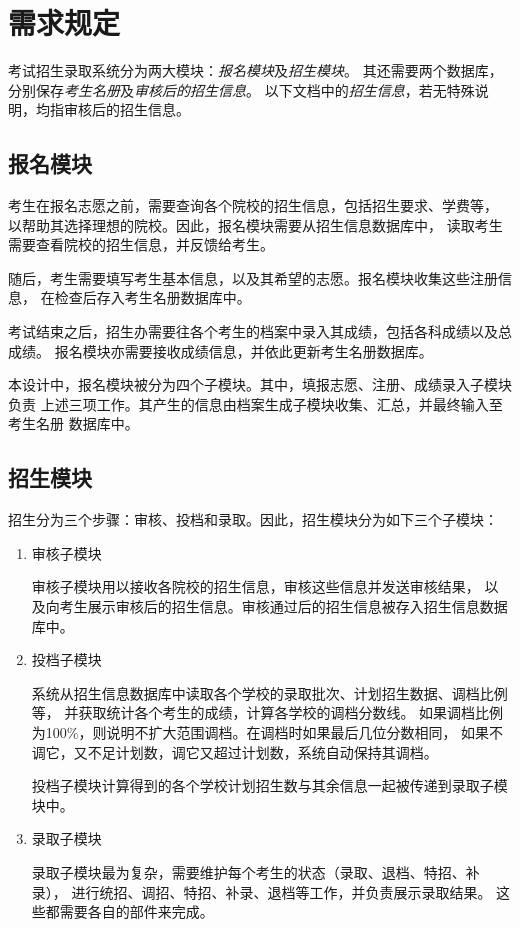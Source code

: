 \documentclass[CJK,utf8]{ctexrep}
\begin{document}
\section*{需求规定}

考试招生录取系统分为两大模块：\emph{报名模块}及\emph{招生模块}。
其还需要两个数据库，分别保存\emph{考生名册}及\emph{审核后的招生信息}。
以下文档中的\emph{招生信息}，若无特殊说明，均指审核后的招生信息。

\subsection*{报名模块}

考生在报名志愿之前，需要查询各个院校的招生信息，包括招生要求、学费等，
以帮助其选择理想的院校。因此，报名模块需要从招生信息数据库中，
读取考生需要查看院校的招生信息，并反馈给考生。

随后，考生需要填写考生基本信息，以及其希望的志愿。报名模块收集这些注册信息，
在检查后存入考生名册数据库中。

考试结束之后，招生办需要往各个考生的档案中录入其成绩，包括各科成绩以及总成绩。
报名模块亦需要接收成绩信息，并依此更新考生名册数据库。

本设计中，报名模块被分为四个子模块。其中，填报志愿、注册、成绩录入子模块负责
上述三项工作。其产生的信息由档案生成子模块收集、汇总，并最终输入至考生名册
数据库中。

\subsection*{招生模块}

招生分为三个步骤：审核、投档和录取。因此，招生模块分为如下三个子模块：

\begin{enumerate}
	\item 审核子模块
	
	审核子模块用以接收各院校的招生信息，审核这些信息并发送审核结果，
	以及向考生展示审核后的招生信息。审核通过后的招生信息被存入招生信息数据库中。
	
	\item 投档子模块
	
	系统从招生信息数据库中读取各个学校的录取批次、计划招生数据、调档比例等，
	并获取统计各个考生的成绩，计算各学校的调档分数线。
	如果调档比例为100\%，则说明不扩大范围调档。在调档时如果最后几位分数相同，
	如果不调它，又不足计划数，调它又超过计划数，系统自动保持其调档。
	
	投档子模块计算得到的各个学校计划招生数与其余信息一起被传递到录取子模块中。
	
	\item 录取子模块
	
	录取子模块最为复杂，需要维护每个考生的状态（录取、退档、特招、补录），
	进行统招、调招、特招、补录、退档等工作，并负责展示录取结果。
	这些都需要各自的部件来完成。
\end{enumerate}
\end{document}
